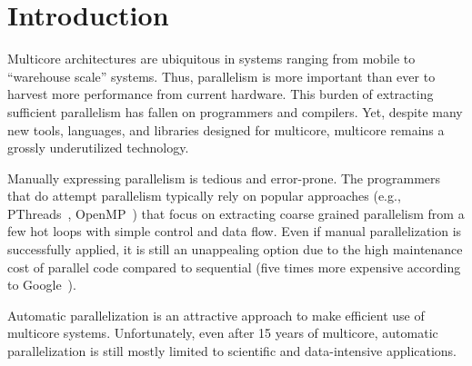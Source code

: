 \section{Introduction}


Multicore architectures are ubiquitous in systems ranging from mobile to
``warehouse scale'' systems. Thus, parallelism is more important than ever to
harvest more performance from current hardware.  This burden of extracting
sufficient parallelism has fallen on programmers and compilers. Yet, despite
many new tools, languages, and libraries designed for multicore, multicore
remains a grossly underutilized technology.



Manually expressing parallelism is tedious and error-prone. The programmers that
do attempt parallelism typically rely on popular approaches (e.g.,
PThreads~\cite{pthread:web}, OpenMP~\cite{openmp:web}) that focus on extracting
coarse grained parallelism from a few hot loops with simple control and data
flow. Even if manual parallelization is successfully applied,
it is still an unappealing option due to the high maintenance cost of parallel
code compared to sequential (five times more expensive according to
Google~\cite{google_cite_simone}).
%

Automatic parallelization is an attractive approach to make efficient use of
multicore systems.
Unfortunately, even after 15 years of multicore, automatic parallelization is
still mostly limited to scientific and data-intensive applications.


